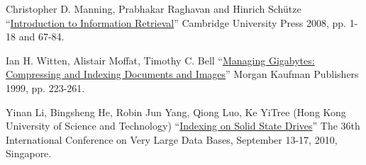 \begin{thebibliography}{9}

		\item Christopher D. Manning, Prabhakar Raghavan and Hinrich Schütze \enquote{\href{https://nlp.stanford.edu/IR-book/pdf/04const.pdf}{Introduction to Information Retrieval}}  Cambridge University Press 2008, pp. 1-18 and 67-84.

	 \item Ian H. Witten, Alistair Moffat, Timothy C. Bell \enquote{\href{https://books.google.de/books?id=2F74jyPl48EC&dq=Witten+et+al.+index+1999&lr=&hl=de&source=gbs_navlinks_s}{Managing Gigabytes: Compressing and Indexing Documents and Images}}  Morgan Kaufman Publishers 1999, pp. 223-261.
	
	\item Yinan Li, Bingsheng He, Robin Jun Yang, Qiong Luo, Ke YiTree (Hong Kong University of Science and Technology) \enquote{\href{http://pages.cs.wisc.edu/~yinan/paper/fdtree_pvldb.pdf}{Indexing on Solid State Drives}} The 36th International Conference on Very Large Data Bases, September 13-17,
2010, Singapore.
\end{thebibliography}
